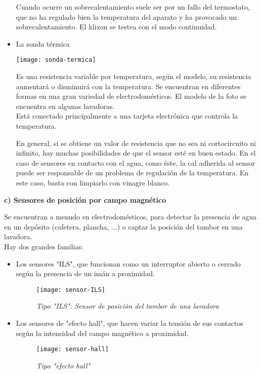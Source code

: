 \begin{itemize}
\begin{normalize}
Cuando ocurre un sobrecalentamiento suele ser por un fallo del termostato, que no ha regulado bien la temperatura del aparato y ha provocado un sobrecalentamiento.
El klixon se testea con el modo continuidad.
\end{normalize}

\item La sonda térmica

\begin{normalize}
\begin{minipage}[h]{\textwidth}\vspace{0pt}
\texttt{[image: sonda-termica]}
\centering
\end{minipage}

Es una resistencia variable por temperatura, según el modelo, su resistencia aumentará o disminuirá con la temperatura.
Se encuentran en diferentes formas en una gran variedad de electrodomésticos.
El modelo de la foto se encuentra en algunas lavadoras.
\\

Está conectado principalmente a una tarjeta electrónica que controla la
temperatura.

En general, si se obtiene un valor de resistencia que no sea ni cortocircuito ni infinito, hay muchas posibilidades de que el sensor esté en buen estado.
En el caso de sensores en contacto con el agua, como éste, la cal adherida al sensor 
puede ser responsable de un problema de regulación de la temperatura.
En este caso, basta con limpiarlo con vinagre blanco.
\end{normalize}

\end{itemize}
\newpage
\begin{center}
\textbf{c) Sensores de posición por campo magnético}
\end{center}
Se encuentran a menudo en electrodomésticos, para detectar la presencia de agua en un depósito (cafetera, plancha, ...) o captar la posición del tambor en una lavadora.\\


Hay dos grandes familias:

\begin{itemize}
\item Los sensores "ILS", que funcionan como un interruptor abierto o cerrado según la presencia de un imán a proximidad.

\begin{figure}[h]
\centering
\texttt{[image: sensor-ILS]}
\caption*{\textit{Tipo "ILS": Sensor de posición del tambor de una lavadora}}
\end{figure}

\item Los sensores de "efecto hall", que hacen variar la tensión de sus contactos según la intensidad del campo magnético a proximidad.

\begin{figure}[h]
\centering
\texttt{[image: sensor-hall]}
\caption*{\textit{Tipo "efecto hall"}}
\end{figure}

\end{itemize}
\newpage 

